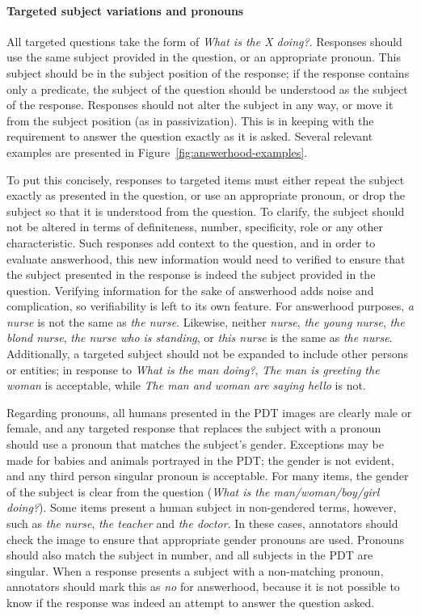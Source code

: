 \documentclass[12pt,notitlepage]{article}
\begin{document}
\paragraph{Targeted subject variations and pronouns}
All targeted questions take the form of \textit{What is the X doing?}. Responses should use the same subject provided in the question, or an appropriate pronoun. This subject should be in the subject position of the response; if the response contains only a predicate, the subject of the question should be understood as the subject of the response. Responses should not alter the subject in any way, or move it from the subject position (as in passivization). This is in keeping with the requirement to answer the question exactly as it is asked. Several relevant examples are presented in Figure~\ref{fig:answerhood-examples}.

To put this concisely, responses to targeted items must either repeat the subject exactly as presented in the question, or use an appropriate pronoun, or drop the subject so that it is understood from the question. To clarify, the subject should not be altered in terms of definiteness, number, specificity, role or any other characteristic. Such responses add context to the question, and in order to evaluate answerhood, this new information would need to verified to ensure that the subject presented in the response is indeed the subject provided in the question. Verifying information for the sake of answerhood adds noise and complication, so verifiability is left to its own feature. For answerhood purposes, \textit{a nurse} is not the same as \textit{the nurse}. Likewise, neither \textit{nurse}, \textit{the young nurse}, \textit{the blond nurse}, \textit{the nurse who is standing}, or \textit{this nurse} is the same as \textit{the nurse}. Additionally, a targeted subject should not be expanded to include other persons or entities; in response to \textit{What is the man doing?}, \textit{The man is greeting the woman} is acceptable, while \textit{The man and woman are saying hello} is not.

Regarding pronouns, all humans presented in the PDT images are clearly male or female, and any targeted response that replaces the subject with a pronoun should use a pronoun that matches the subject's gender. Exceptions may be made for babies and animals portrayed in the PDT; the gender is not evident, and any third person singular pronoun is acceptable. For many items, the gender of the subject is clear from the question (\textit{What is the man/woman/boy/girl doing?}). Some items present a human subject in non-gendered terms, however, such as \textit{the nurse}, \textit{the teacher} and \textit{the doctor}. In these cases, annotators should check the image to ensure that appropriate gender pronouns are used. Pronouns should also match the subject in number, and all subjects in the PDT are singular. When a response presents a subject with a non-matching pronoun, annotators should mark this as \textit{no} for answerhood, because it is not possible to know if the response was indeed an attempt to answer the question asked. 
\end{document}
